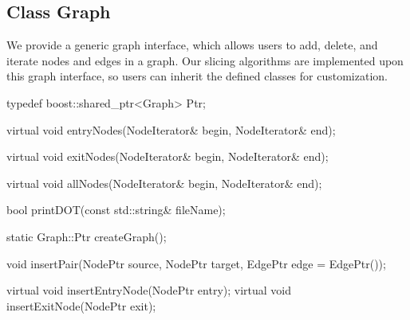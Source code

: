 \subsection{Class Graph}
\label{sec:graph}

We provide a generic graph interface, which allows users to add, delete, and
iterate nodes and edges in a graph. Our slicing algorithms are implemented
upon this graph interface, so users can inherit the defined classes for
customization.

\begin{apient}
typedef boost::shared_ptr<Graph> Ptr;
\end{apient}

\begin{apient}
virtual void entryNodes(NodeIterator& begin, NodeIterator& end);
\end{apient}

\begin{apient}
virtual void exitNodes(NodeIterator& begin, NodeIterator& end);
\end{apient}

\begin{apient}
virtual void allNodes(NodeIterator& begin, NodeIterator& end);
\end{apient}

\begin{apient}
bool printDOT(const std::string& fileName);
\end{apient}

\begin{apient}
static Graph::Ptr createGraph();
\end{apient}

\begin{apient}
void insertPair(NodePtr source, NodePtr target, EdgePtr edge = EdgePtr());
\end{apient}

\begin{apient}
virtual void insertEntryNode(NodePtr entry);
virtual void insertExitNode(NodePtr exit);
\end{apient}

